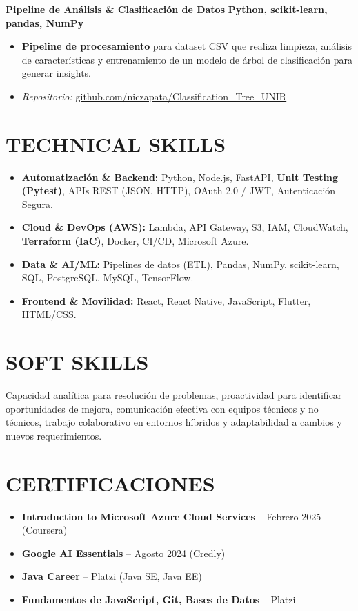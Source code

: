 \documentclass[11pt, a4paper]{article}
\begin{document}
\textbf{Pipeline de Análisis \& Clasificación de Datos} \hfill \textbf{Python, scikit-learn, pandas, NumPy}
\begin{itemize}[leftmargin=*, nosep, topsep=4pt]
	\item \textbf{Pipeline de procesamiento} para dataset CSV que realiza limpieza, análisis de características y entrenamiento de un modelo de árbol de clasificación para generar insights.
	\item \textit{Repositorio:} \href{https://github.com/niczapata/Classification\_Tree\_UNIR}{github.com/niczapata/Classification\_Tree\_UNIR}
\end{itemize}

\section*{TECHNICAL SKILLS}
\begin{itemize}[nosep, leftmargin=*]
	\item \textbf{Automatización \& Backend:} Python, Node.js, FastAPI, \textbf{Unit Testing (Pytest)}, APIs REST (JSON, HTTP), OAuth 2.0 / JWT, Autenticación Segura.
	\item \textbf{Cloud \& DevOps (AWS):} Lambda, API Gateway, S3, IAM, CloudWatch, \textbf{Terraform (IaC)}, Docker, CI/CD, Microsoft Azure.
	\item \textbf{Data \& AI/ML:} Pipelines de datos (ETL), Pandas, NumPy, scikit-learn, SQL, PostgreSQL, MySQL, TensorFlow.
	\item \textbf{Frontend \& Movilidad:} React, React Native, JavaScript, Flutter, HTML/CSS.
\end{itemize}

\section*{SOFT SKILLS}
Capacidad analítica para resolución de problemas, proactividad para identificar oportunidades de mejora, comunicación efectiva con equipos técnicos y no técnicos, trabajo colaborativo en entornos híbridos y adaptabilidad a cambios y nuevos requerimientos.

\section*{CERTIFICACIONES}
\begin{itemize}[leftmargin=*, nosep]
	\item \textbf{Introduction to Microsoft Azure Cloud Services} – Febrero 2025 (Coursera)
	\item \textbf{Google AI Essentials} – Agosto 2024 (Credly)
	\item \textbf{Java Career} – Platzi (Java SE, Java EE)
	\item \textbf{Fundamentos de JavaScript, Git, Bases de Datos} – Platzi
\end{itemize}
\end{document}
